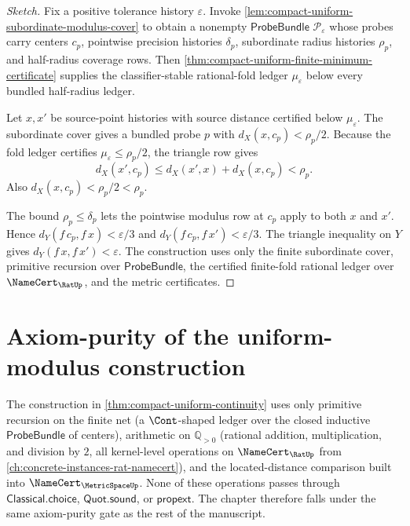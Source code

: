 \begin{proof}[Sketch]
Fix a positive tolerance history $\varepsilon$. Invoke \autoref{lem:compact-uniform-subordinate-modulus-cover} to obtain a nonempty $\mathsf{ProbeBundle}$ $\mathcal{P}_\varepsilon$ whose probes carry centers $c_p$, pointwise precision histories $\delta_p$, subordinate radius histories $\rho_p$, and half-radius coverage rows. Then \autoref{thm:compact-uniform-finite-minimum-certificate} supplies the classifier-stable rational-fold ledger $\mu_\varepsilon$ below every bundled half-radius ledger.

Let $x,x'$ be source-point histories with source distance certified below $\mu_\varepsilon$. The subordinate cover gives a bundled probe $p$ with $d_X(x,c_p)<\rho_p/2$. Because the fold ledger certifies $\mu_\varepsilon \le \rho_p/2$, the triangle row gives
$$
d_X(x',c_p) \le d_X(x',x)+d_X(x,c_p) < \rho_p.
$$
Also $d_X(x,c_p)<\rho_p/2<\rho_p$.

The bound $\rho_p \le \delta_p$ lets the pointwise modulus row at $c_p$ apply to both $x$ and $x'$. Hence $d_Y(f\,c_p,f\,x)<\varepsilon/3$ and $d_Y(f\,c_p,f\,x')<\varepsilon/3$. The triangle inequality on $Y$ gives $d_Y(f\,x,f\,x')<\varepsilon$. The construction uses only the finite subordinate cover, primitive recursion over $\mathsf{ProbeBundle}$, the certified finite-fold rational ledger over $\NameCert_{\RatUp}$, and the metric certificates.
\end{proof}

\section{Axiom-purity of the uniform-modulus construction}
\label{sec:compact-uniform-continuity-axiom-purity}

\begin{remark}
\label{rem:compact-uniform-axiom-purity}
The construction in \autoref{thm:compact-uniform-continuity} uses only primitive recursion on the finite net (a $\Cont$-shaped ledger over the closed inductive $\mathsf{ProbeBundle}$ of centers), arithmetic on $\mathbb{Q}_{>0}$ (rational addition, multiplication, and division by $2$, all kernel-level operations on $\NameCert_{\RatUp}$ from \autoref{ch:concrete-instances-rat-namecert}), and the located-distance comparison built into $\NameCert_{\MetricSpaceUp}$. None of these operations passes through $\mathsf{Classical.choice}$, $\mathsf{Quot.sound}$, or $\mathsf{propext}$. The chapter therefore falls under the same axiom-purity gate as the rest of the manuscript.
\end{remark}

